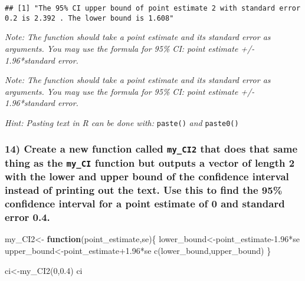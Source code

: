 \documentclass[
  12pt,
]{article}
\newenvironment{Shaded}{\begin{snugshade}}{\end{snugshade}}
\newcommand{\ControlFlowTok}[1]{\textcolor[rgb]{0.13,0.29,0.53}{\textbf{#1}}}
\newcommand{\DecValTok}[1]{\textcolor[rgb]{0.00,0.00,0.81}{#1}}
\newcommand{\FloatTok}[1]{\textcolor[rgb]{0.00,0.00,0.81}{#1}}
\newcommand{\FunctionTok}[1]{\textcolor[rgb]{0.00,0.00,0.00}{#1}}
\newcommand{\NormalTok}[1]{#1}
\newcommand{\OtherTok}[1]{\textcolor[rgb]{0.56,0.35,0.01}{#1}}
\newcommand{\SpecialCharTok}[1]{\textcolor[rgb]{0.00,0.00,0.00}{#1}}
\begin{document}
\begin{verbatim}
## [1] "The 95% CI upper bound of point estimate 2 with standard error 0.2 is 2.392 . The lower bound is 1.608"
\end{verbatim}

\emph{Note: The function should take a point estimate and its standard
error as arguments. You may use the formula for 95\% CI: point estimate
+/- 1.96*standard error.}

\emph{Note: The function should take a point estimate and its standard
error as arguments. You may use the formula for 95\% CI: point estimate
+/- 1.96*standard error.}

\emph{Hint: Pasting text in R can be done with:} \texttt{paste()}
\emph{and} \texttt{paste0()}

\hypertarget{create-a-new-function-called-my_ci2-that-does-that-same-thing-as-the-my_ci-function-but-outputs-a-vector-of-length-2-with-the-lower-and-upper-bound-of-the-confidence-interval-instead-of-printing-out-the-text.-use-this-to-find-the-95-confidence-interval-for-a-point-estimate-of-0-and-standard-error-0.4.}{%
\subsubsection{\texorpdfstring{14) Create a new function called
\texttt{my\_CI2} that does that same thing as the \texttt{my\_CI}
function but outputs a vector of length 2 with the lower and upper bound
of the confidence interval instead of printing out the text. Use this to
find the 95\% confidence interval for a point estimate of 0 and standard
error
0.4.}{14) Create a new function called my\_CI2 that does that same thing as the my\_CI function but outputs a vector of length 2 with the lower and upper bound of the confidence interval instead of printing out the text. Use this to find the 95\% confidence interval for a point estimate of 0 and standard error 0.4.}}\label{create-a-new-function-called-my_ci2-that-does-that-same-thing-as-the-my_ci-function-but-outputs-a-vector-of-length-2-with-the-lower-and-upper-bound-of-the-confidence-interval-instead-of-printing-out-the-text.-use-this-to-find-the-95-confidence-interval-for-a-point-estimate-of-0-and-standard-error-0.4.}}

\begin{Shaded}
\begin{Highlighting}[]
\NormalTok{my\_CI2}\OtherTok{\textless{}{-}} \ControlFlowTok{function}\NormalTok{(point\_estimate,se)\{}
\NormalTok{  lower\_bound}\OtherTok{\textless{}{-}}\NormalTok{point\_estimate}\FloatTok{{-}1.96}\SpecialCharTok{*}\NormalTok{se}
\NormalTok{  upper\_bound}\OtherTok{\textless{}{-}}\NormalTok{point\_estimate}\FloatTok{+1.96}\SpecialCharTok{*}\NormalTok{se}
  \FunctionTok{c}\NormalTok{(lower\_bound,upper\_bound)}
\NormalTok{\}}

\NormalTok{ci}\OtherTok{\textless{}{-}}\FunctionTok{my\_CI2}\NormalTok{(}\DecValTok{0}\NormalTok{,}\FloatTok{0.4}\NormalTok{)}
\NormalTok{ci}
\end{Highlighting}
\end{Shaded}
\end{document}
